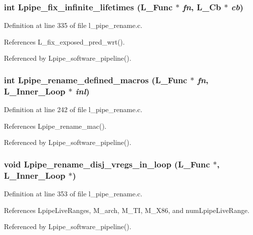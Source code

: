 \subsubsection{\setlength{\rightskip}{0pt plus 5cm}int Lpipe\_\-fix\_\-infinite\_\-lifetimes (L\_\-Func $\ast$ {\em fn}, L\_\-Cb $\ast$ {\em cb})}\label{l__pipe__rename_8h_7dc8d4655a2ef52a3198fafa93d3ab1a}




Definition at line 335 of file l\_\-pipe\_\-rename.c.

References L\_\-fix\_\-exposed\_\-pred\_\-wrt().

Referenced by Lpipe\_\-software\_\-pipeline().
\subsubsection{\setlength{\rightskip}{0pt plus 5cm}int Lpipe\_\-rename\_\-defined\_\-macros (L\_\-Func $\ast$ {\em fn}, L\_\-Inner\_\-Loop $\ast$ {\em inl})}\label{l__pipe__rename_8h_f87757396ae9cd301b0f54e3871e342a}




Definition at line 242 of file l\_\-pipe\_\-rename.c.

References Lpipe\_\-rename\_\-mac().

Referenced by Lpipe\_\-software\_\-pipeline().
\subsubsection{\setlength{\rightskip}{0pt plus 5cm}void Lpipe\_\-rename\_\-disj\_\-vregs\_\-in\_\-loop (L\_\-Func $\ast$, L\_\-Inner\_\-Loop $\ast$)}\label{l__pipe__rename_8h_dd152c5db4e8084994802b61e35662b9}




Definition at line 353 of file l\_\-pipe\_\-rename.c.

References Lpipe\-Live\-Ranges, M\_\-arch, M\_\-TI, M\_\-X86, and num\-Lpipe\-Live\-Range.

Referenced by Lpipe\_\-software\_\-pipeline().